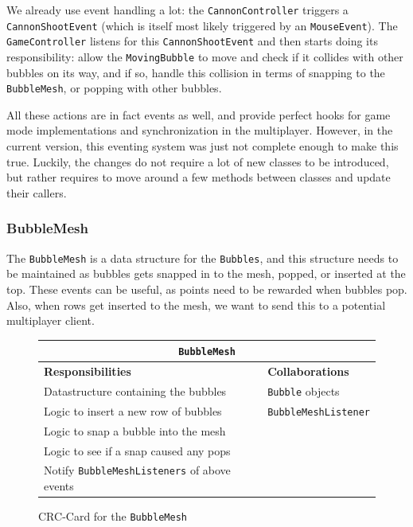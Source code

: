 \documentclass[a4paper]{article}
\begin{document}
We already use event handling a lot: the \texttt{CannonController} triggers a \texttt{CannonShootEvent} (which is itself most likely triggered by an \texttt{MouseEvent}). The \texttt{GameController} listens for this \texttt{CannonShootEvent} and then starts doing its responsibility: allow the \texttt{MovingBubble} to move and check if it collides with other bubbles on its way, and if so, handle this collision in terms of snapping to the \texttt{BubbleMesh}, or popping with other bubbles.

\par All these actions are in fact events as well, and provide perfect hooks for game mode implementations and  synchronization in the multiplayer. However, in the current version, this eventing system was just not complete enough to make this true. Luckily, the changes do not require a lot of new classes to be introduced, but rather requires to move around a few methods between classes and update their callers.

\subsubsection*{BubbleMesh}
The \texttt{BubbleMesh} is a data structure for the \texttt{Bubbles}, and this structure needs to be maintained as bubbles gets snapped in to the mesh, popped, or inserted at the top. These events can be useful, as points need to be rewarded when bubbles pop. Also, when rows get inserted to the mesh, we want to send this to a potential multiplayer client.

\begin{figure}[H]
    \begin{center}
    \begin{tabular}{ | p{8cm} | p{4cm} | }
      \multicolumn{2}{c}{\texttt{BubbleMesh}} \\ \hline
      \textbf{Responsibilities} & \textbf{Collaborations} \\ \hline
      Datastructure containing the bubbles & \texttt{Bubble} objects \\
      Logic to insert a new row of bubbles & \texttt{BubbleMeshListener} \\
      Logic to snap a bubble into the mesh & \\
      Logic to see if a snap caused any pops & \\
      Notify \texttt{BubbleMeshListeners} of above events & \\
      \hline
    \end{tabular}
    \end{center}
    \caption{CRC-Card for the \texttt{BubbleMesh}}
\end{figure}
\end{document}
